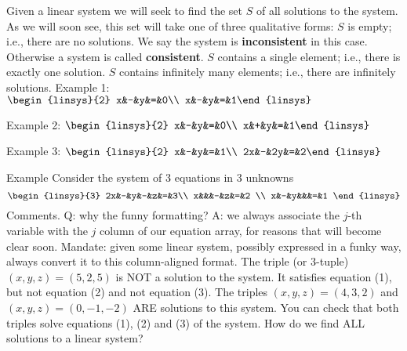\begin{frame}
Given a linear system we will seek to find the {\color{blue} set} $S$ of \alert{all} solutions to the system. As we will soon see, this set will take one of three qualitative forms:
\bb[(i)]
\ii $S$ is empty; i.e., there are no solutions. We say the system is {\bf inconsistent} in this case. Otherwise a system is called {\bf consistent}. 
\ii $S$ contains a single element; i.e., there is exactly one solution.
\ii $S$ contains infinitely many elements; i.e., there are infinitely solutions. 
\ee
\pause
\alert{Example 1}: $\begin{linsys}{2} x&-&y&=&0\\ x&-&y&=&1\end{linsys}$

\bpause \alert{Example 2}: $\begin{linsys}{2} x&-&y&=&0\\ x&+&y&=&1\end{linsys}$

\bpause 
\alert{Example 3}: $\begin{linsys}{2} x&-&y&=&1\\ 2x&-&2y&=&2\end{linsys}$

\end{frame}
\begin{frame}{Example}
Consider the system of 3 equations in 3 unknowns
\[
\begin{linsys}{3}
 2x&-&y&-&z&=&3\\
 x&&&-&z&=&2 \\
 x&-&y&&&=&1
\end{linsys}
\]
\pause\alert{Comments.}
\bb
\pause\ii Q: why the funny formatting? A: we always associate the $j$-th variable with the $j$ column of our equation array, for reasons that will become clear soon. \alert{Mandate:} given some linear system, possibly expressed in a funky way, always convert it to this column-aligned format.
\pause\ii The triple (or $3$-tuple) $(x,y,z)=(5,2,5)$ is NOT a solution to the system. It satisfies equation (1), but not equation (2) and not equation (3). 
\pause\ii The triples $(x,y,z)=(4,3,2)$ and $(x,y,z)=(0,-1,-2)$ ARE solutions to this system. You can check that both triples solve equations (1), (2) and (3) of the system.
\pause\ii How do we find \alert{ALL} solutions to a linear system?
\ee
\end{frame}
